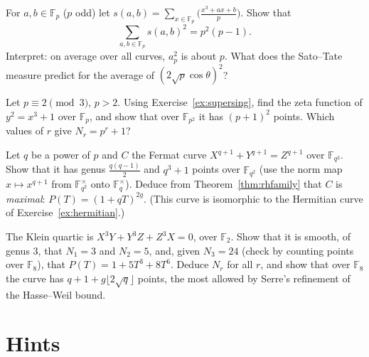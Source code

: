 \begin{exercise}[$\star\star$]\label{ex:moment}
For $a,b\in\mathbb F_p$ ($p$ odd) let $s(a,b)=\sum_{x\in\mathbb F_p}\bigl(\frac{x^3+ax+b}p\bigr)$. Show that
\[
\sum_{a,b\in\mathbb F_p}s(a,b)^2=p^2(p-1).
\]
Interpret: on average over all curves, $a_p^2$ is about $p$. What does the Sato--Tate measure predict for the average of $(2\sqrt p\cos\theta)^2$?
\end{exercise}

\begin{exercise}[$\star\star$]\label{ex:supersingp2}
Let $p\equiv2\pmod3$, $p>2$. Using Exercise~\ref{ex:supersing}, find the zeta function of $y^2=x^3+1$ over $\mathbb F_p$, and show that over $\mathbb F_{p^2}$ it has
$(p+1)^2$ points. Which values of $r$ give $N_r=p^r+1$?
\end{exercise}

\begin{exercise}[$\star\star$]\label{ex:maximal}
Let $q$ be a power of $p$ and $C$ the Fermat curve $X^{q+1}+Y^{q+1}=Z^{q+1}$ over $\mathbb F_{q^2}$. Show that it has genus $\frac{q(q-1)}2$ and $q^3+1$ points over
$\mathbb F_{q^2}$ (use the norm map $x\mapsto x^{q+1}$ from $\mathbb F_{q^2}^\times$ onto $\mathbb F_q^\times$). Deduce from Theorem~\ref{thm:rhfamily} that $C$ is
\emph{maximal}: $P(T)=(1+qT)^{2g}$. (This curve is isomorphic to the Hermitian curve of Exercise~\ref{ex:hermitian}.)
\end{exercise}

\begin{exercise}[$\star\star\star$]\label{ex:klein}
The Klein quartic is $X^3Y+Y^3Z+Z^3X=0$, over $\mathbb F_2$. Show that it is smooth, of genus $3$, that $N_1=3$ and $N_2=5$, and, given $N_3=24$ (check by counting points over $\mathbb F_8$), that $P(T)=1+5T^3+8T^6$. Deduce $N_r$ for all $r$, and show that over $\mathbb F_8$ the curve has $q+1+g\lfloor2\sqrt q\rfloor$ points, the most allowed by
Serre's refinement of the Hasse--Weil bound.
\end{exercise}

\section{Hints}

